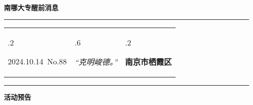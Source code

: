 \documentclass[letterpaper, 12pt]{article}
\begin{document}
\begin{center}
    \Huge\textbf{南哪大专醒前消息}
\end{center}
\vspace{4mm}
\hrule
\renewcommand\tabularxcolumn[1]{m{#1}}
\begin{tabularx}{\textwidth}{>{\hsize.2\hsize}X>{\hsize.6\hsize}X>{\hsize.2\hsize}X}
    \begin{flushleft}
        2024.10.14\, No.88
    \end{flushleft}
    &
    \begin{center}
        \textit{“克明峻德。”}
    \end{center}
    &
    \begin{flushright}
        \textbf{南京市栖霞区}
    \end{flushright}
\end{tabularx}
\vspace{-3.5mm}
\hrule
\vspace{4mm}
\centerline{\huge\textbf{活动预告}}
\end{document}
